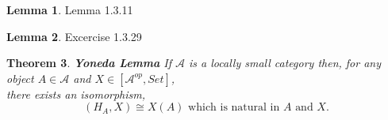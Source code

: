 \documentclass[18pt,a4paper]{article}
\newtheorem{theorem}{Theorem}[section]
\theoremstyle{definition}
\newtheorem{lemma}[theorem]{Lemma}
\begin{document}
\begin{lemma}
	Lemma 1.3.11
\end{lemma}
\begin{lemma}
	Excercise 1.3.29
\end{lemma}

\begin{theorem}{\textbf{Yoneda Lemma}} %
	If $\mathcal{A} $ is a locally small category then, for any object $A \in \mathcal{A} $
	and $X \in [ \mathcal{A}^{op},Set]$,\\ there exists an isomorphism,
	\begin{equation} [ \mathcal{A} ^{op},Set ](H_A,X)\cong X(A) \text{ which is natural in } A \text{ and } X.\end{equation}
\end{theorem}
\end{document}
